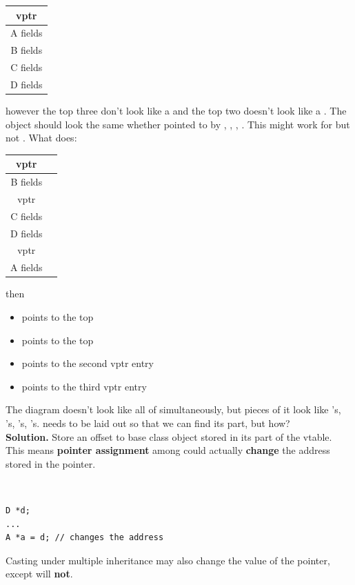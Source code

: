 \documentclass[english, 11pt]{article}
\begin{document}
\begin{center}
    \begin{tabular}{|c|}
    \hline
    vptr \\
    \hline
    A fields \\
    \hline
    B fields \\
    \hline
    C fields \\
    \hline
    D fields \\
    \hline
  \end{tabular}
\end{center}
however the top three don't look like a  and the top two doesn't look like a . The object should look the same whether pointed to by , , , . This might work for  but not . What  does:
\begin{center}
    \begin{tabular}{|c| r}
    \hline
    vptr \\
    \hline
    B fields \\
    \hline
    vptr \\
    \hline
    C fields \\
    \hline
    D fields \\
    \hline
    vptr \\
    \hline
    A fields \\
    \hline
  \end{tabular}
\end{center}
then
\begin{itemize}
  \item {} points to the top
  \item {} points to the top
  \item {} points to the second vptr entry
  \item {} points to the third vptr entry
\end{itemize}

The diagram doesn't look like all of  simultaneously, but pieces of it look like 's, 's, 's, 's.  needs to be laid out so that we can find its  part, but how? \\

\textbf{Solution.} Store an offset to base class object stored in its part of the vtable. This means \textbf{pointer assignment} among  could actually \textbf{change} the address stored in the pointer.

\begin{exmp} \
  \begin{lstlisting}
D *d;
...
A *a = d; // changes the address
  \end{lstlisting}
  Casting under multiple inheritance may also change the value of the pointer, except  will \textbf{not}.
\end{exmp}
\end{document}
